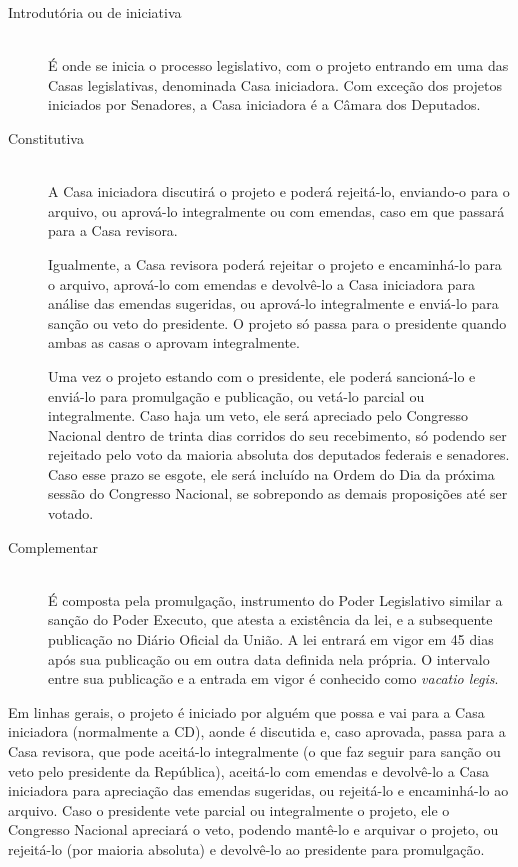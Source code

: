 \documentclass[a4paper,titlepage]{ppgi}\usepackage[]{graphicx}\usepackage[]{color}
\begin{document}
\begin{description}
\item[Introdutória ou de iniciativa] \hfill \\
É onde se inicia o processo legislativo, com o projeto entrando em uma das
Casas legislativas, denominada Casa iniciadora. Com exceção dos projetos
iniciados por Senadores, a Casa iniciadora é a Câmara dos Deputados.

\item[Constitutiva] \hfill \\
A Casa iniciadora discutirá o projeto e poderá rejeitá-lo, enviando-o para o
arquivo, ou aprová-lo integralmente ou com emendas, caso em que passará para a
Casa revisora.

Igualmente, a Casa revisora poderá rejeitar o projeto e encaminhá-lo para o
arquivo, aprová-lo com emendas e devolvê-lo a Casa iniciadora para análise das
emendas sugeridas, ou aprová-lo integralmente e enviá-lo para sanção ou veto do
presidente. O projeto só passa para o presidente quando ambas as casas o
aprovam integralmente.

Uma vez o projeto estando com o presidente, ele poderá sancioná-lo e enviá-lo
para promulgação e publicação, ou vetá-lo parcial ou integralmente. Caso haja
um veto, ele será apreciado pelo Congresso Nacional dentro de trinta dias
corridos do seu recebimento, só podendo ser rejeitado pelo voto da maioria
absoluta dos deputados federais e senadores. Caso esse prazo se esgote, ele
será incluído na Ordem do Dia da próxima sessão do Congresso Nacional, se
sobrepondo as demais proposições até ser votado.

\item[Complementar] \hfill \\
É composta pela promulgação, instrumento do Poder Legislativo similar a
sanção do Poder Executo, que atesta a existência da lei, e a subsequente
publicação no Diário Oficial da União. A lei entrará em vigor em 45 dias após
sua publicação ou em outra data definida nela própria. O intervalo entre sua
publicação e a entrada em vigor é conhecido como \emph{vacatio legis}.
\end{description}

Em linhas gerais, o projeto é iniciado por alguém que possa e vai para a Casa
iniciadora (normalmente a CD), aonde é discutida e, caso aprovada, passa para a
Casa revisora, que pode aceitá-lo integralmente (o que faz seguir para sanção
ou veto pelo presidente da República), aceitá-lo com emendas e devolvê-lo a
Casa iniciadora para apreciação das emendas sugeridas, ou rejeitá-lo e
encaminhá-lo ao arquivo. Caso o presidente vete parcial ou integralmente o
projeto, ele o Congresso Nacional apreciará o veto, podendo mantê-lo e arquivar
o projeto, ou rejeitá-lo (por maioria absoluta) e devolvê-lo ao presidente para
promulgação.
\end{document}
